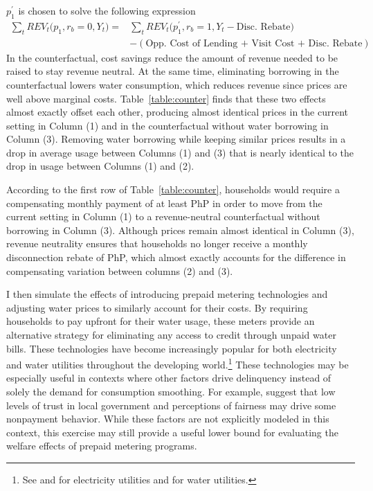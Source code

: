 \documentclass[12pt]{article}
\begin{document}
$p^{\prime}_1$ is chosen to solve the following expression
\begin{align*}
\sum_t REV_t \big(p_1,r_b = 0,Y_t \big) =& \sum_t REV_t \big(p^{\prime}_1,r_b = 1, Y_t - \text{Disc. Rebate} \big) \\
& - (\text{Opp. Cost of Lending + Visit Cost + Disc. Rebate})
\end{align*}
In the counterfactual, cost savings reduce the amount of revenue needed to be raised to stay revenue neutral.  At the same time, eliminating borrowing in the counterfactual lowers water consumption, which reduces revenue since prices are well above marginal costs.  Table~\ref{table:counter} finds that these two effects almost exactly offset each other, producing almost identical prices in the current setting in Column (1) and in the counterfactual without water borrowing in Column (3).  Removing water borrowing while keeping similar prices results in a drop in average usage between Columns (1) and (3) that is nearly identical to the drop in usage between Columns (1) and (2).

According to the first row of Table~\ref{table:counter}, households would require a compensating monthly payment of at least PhP in order to move from the current setting in  Column (1) to a revenue-neutral counterfactual without borrowing in Column (3).  Although prices remain almost identical in Column (3), revenue neutrality ensures that households no longer receive a monthly disconnection rebate of PhP, which almost exactly accounts for the difference in compensating variation between columns (2) and (3).  


I then simulate the effects of introducing prepaid metering technologies and adjusting water prices to similarly account for their costs. By requiring households to pay upfront for their water usage, these meters provide an alternative strategy for  eliminating any access to credit through unpaid water bills.  These technologies have become increasingly popular for both electricity and water utilities throughout the developing world.\footnote{See \cite{jack2016charging} and \cite{northeast2014} for electricity utilities and \cite{heymans2014limits} for water utilities.}  These technologies may be especially useful in contexts where other factors drive delinquency instead of solely the demand for consumption smoothing.   For example, \cite{szabo2015reducing} suggest that low levels of trust in local government and perceptions of fairness may drive some nonpayment behavior.  While these factors are not explicitly modeled in this context, this exercise may still provide a useful lower bound for evaluating the welfare effects of prepaid metering programs.
\end{document}
